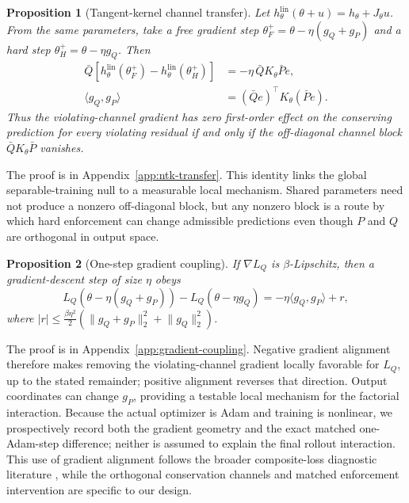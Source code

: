 \documentclass{article}
\newtheorem{proposition}{Proposition}
\begin{document}
\begin{proposition}[Tangent-kernel channel transfer]
\label{prop:ntk-transfer}
Let $h_\theta^{\mathrm{lin}}(\theta+u)=h_\theta+J_\theta u$. From the same parameters, take a free
gradient step $\theta_F^+=\theta-\eta(g_Q+g_P)$ and a hard step
$\theta_H^+=\theta-\eta g_Q$. Then
\begin{align}
  \bar Q\!\left[h_\theta^{\mathrm{lin}}(\theta_F^+)
  -h_\theta^{\mathrm{lin}}(\theta_H^+)\right]
  &=-\eta\,\bar QK_\theta\bar P e, \\
  \langle g_Q,g_P\rangle
  &=(\bar Qe)^\top K_\theta(\bar Pe).
  \label{eq:ntk-transfer}
\end{align}
Thus the violating-channel gradient has zero first-order effect on the conserving prediction for
every violating residual if and only if the off-diagonal channel block
$\bar QK_\theta\bar P$ vanishes.
\end{proposition}

The proof is in Appendix~\ref{app:ntk-transfer}. This identity links the global separable-training
null to a measurable local mechanism. Shared
parameters need not produce a nonzero off-diagonal block, but any nonzero block is a route by which
hard enforcement can change admissible predictions even though $P$ and $Q$ are orthogonal in
output space.

\begin{proposition}[One-step gradient coupling]
\label{prop:gradient-coupling}
If $\nabla L_Q$ is $\beta$-Lipschitz, then a gradient-descent step of size $\eta$ obeys
\begin{equation}
  L_Q\!\left(\theta-\eta(g_Q+g_P)\right)
  -L_Q\!\left(\theta-\eta g_Q\right)
  =-\eta\langle g_Q,g_P\rangle+r,
  \label{eq:gradient-coupling}
\end{equation}
where
$|r|\leq\frac{\beta\eta^2}{2}
\left(\lVert g_Q+g_P\rVert_2^2+\lVert g_Q\rVert_2^2\right)$.
\end{proposition}

The proof is in Appendix~\ref{app:gradient-coupling}. Negative gradient alignment therefore makes
removing the violating-channel gradient locally favorable for $L_Q$, up to the stated remainder;
positive alignment reverses that direction. Output coordinates can change $g_P$, providing a
testable local mechanism for the factorial interaction. Because the actual optimizer is Adam and
training is nonlinear, we prospectively record both the gradient geometry and the exact matched
one-Adam-step difference; neither is assumed to explain the final rollout interaction. This use of
gradient alignment follows the broader composite-loss diagnostic literature
\citep{hwang2024dcgd,wang2025gradient}, while the orthogonal conservation channels and matched
enforcement intervention are specific to our design.
\end{document}
